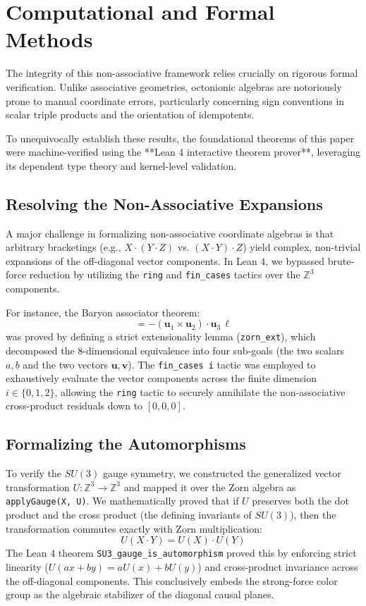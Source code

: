 \section{Computational and Formal Methods}

The integrity of this non-associative framework relies crucially on rigorous formal verification. Unlike associative geometries, octonionic algebras are notoriously prone to manual coordinate errors, particularly concerning sign conventions in scalar triple products and the orientation of idempotents. 

To unequivocally establish these results, the foundational theorems of this paper were machine-verified using the **Lean 4 interactive theorem prover**, leveraging its dependent type theory and kernel-level validation.

\subsection{Resolving the Non-Associative Expansions}
A major challenge in formalizing non-associative coordinate algebras is that arbitrary bracketings (e.g., $X \cdot (Y \cdot Z)$ vs. $(X \cdot Y) \cdot Z$) yield complex, non-trivial expansions of the off-diagonal vector components. In Lean 4, we bypassed brute-force reduction by utilizing the \texttt{ring} and \texttt{fin\_cases} tactics over the $\mathbb{Z}^3$ components.

For instance, the Baryon associator theorem:
\begin{equation}
[N_{\text{upper}}(u_1), N_{\text{upper}}(u_2), N_{\text{upper}}(u_3)] = -(\mathbf{u}_1 \times \mathbf{u}_2) \cdot \mathbf{u}_3 \, \ell
\end{equation}
was proved by defining a strict extensionality lemma (\texttt{zorn\_ext}), which decomposed the 8-dimensional equivalence into four sub-goals (the two scalars $a,b$ and the two vectors $\mathbf{u},\mathbf{v}$). The \texttt{fin\_cases i} tactic was employed to exhaustively evaluate the vector components across the finite dimension $i \in \{0, 1, 2\}$, allowing the \texttt{ring} tactic to securely annihilate the non-associative cross-product residuals down to $[0,0,0]$.

\subsection{Formalizing the Automorphisms}
To verify the $SU(3)$ gauge symmetry, we constructed the generalized vector transformation $U: \mathbb{Z}^3 \to \mathbb{Z}^3$ and mapped it over the Zorn algebra as \texttt{applyGauge(X, U)}. We mathematically proved that if $U$ preserves both the dot product and the cross product (the defining invariants of $SU(3)$), then the transformation commutes exactly with Zorn multiplication:
\begin{equation}
U(X \cdot Y) = U(X) \cdot U(Y)
\end{equation}
The Lean 4 theorem \texttt{SU3\_gauge\_is\_automorphism} proved this by enforcing strict linearity ($U(ax+by) = aU(x)+bU(y)$) and cross-product invariance across the off-diagonal components. This conclusively embeds the strong-force color group as the algebraic stabilizer of the diagonal causal planes.

